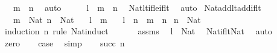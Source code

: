 \begin{isabellebody}
\ {\isachardoublequoteopen}{\isachardot}{\kern0pt}{\isachardot}{\kern0pt}{\isachardot}{\kern0pt}\ {\isasymle}\ m\ {\isacharplus}{\kern0pt}\ n{\isachardoublequoteclose}\ \isamarkupfalse%
\ auto\isanewline
\ \ \isamarkupfalse%
\ \isamarkupfalse%
\ {\isachardoublequoteopen}l\ {\isacharless}{\kern0pt}\ m\ {\isacharplus}{\kern0pt}\ n{\isachardoublequoteclose}\ \isamarkupfalse%
\ Nat{\isacharunderscore}{\kern0pt}lt{\isacharunderscore}{\kern0pt}if{\isacharunderscore}{\kern0pt}le{\isacharunderscore}{\kern0pt}if{\isacharunderscore}{\kern0pt}lt\ \isamarkupfalse%
\ auto\isanewline
\isanewline
{}\isamarkupfalse%
%
\endisatagproof
{\isafoldproof}%
%
\isadelimproof
\isanewline
%
\endisadelimproof
\isanewline
{}\isamarkupfalse%
\ Nat{\isacharunderscore}{\kern0pt}add{\isacharunderscore}{\kern0pt}lt{\isacharunderscore}{\kern0pt}add{\isacharunderscore}{\kern0pt}if{\isacharunderscore}{\kern0pt}lt{\isacharcolon}{\kern0pt}\isanewline
\ \ \ {\isachardoublequoteopen}m\ {\isacharcolon}{\kern0pt}\ Nat{\isachardoublequoteclose}\ {\isachardoublequoteopen}n\ {\isacharcolon}{\kern0pt}\ Nat{\isachardoublequoteclose}\isanewline
\ \ \ {\isachardoublequoteopen}l\ {\isacharless}{\kern0pt}\ m{\isachardoublequoteclose}\isanewline
\ \ \ {\isachardoublequoteopen}l\ {\isacharplus}{\kern0pt}\ n\ {\isacharless}{\kern0pt}\ m\ {\isacharplus}{\kern0pt}\ n{\isachardoublequoteclose}\isanewline
%
\isadelimproof
%
\endisadelimproof
%
\isatagproof
{}\isamarkupfalse%
\ {\isacartoucheopen}n\ {\isacharcolon}{\kern0pt}\ Nat{\isacartoucheclose}\isanewline
{}\isamarkupfalse%
\ {\isacharparenleft}{\kern0pt}induction\ n\ rule{\isacharcolon}{\kern0pt}\ Nat{\isacharunderscore}{\kern0pt}induct{\isacharparenright}{\kern0pt}\isanewline
\ \ \isanewline
\ \ \isamarkupfalse%
\ assms\ \isamarkupfalse%
\ {\isachardoublequoteopen}l\ {\isacharcolon}{\kern0pt}\ Nat{\isachardoublequoteclose}\ \isamarkupfalse%
\ Nat{\isacharunderscore}{\kern0pt}if{\isacharunderscore}{\kern0pt}lt{\isacharunderscore}{\kern0pt}Nat\ \isamarkupfalse%
\ auto\isanewline
\ \ \isamarkupfalse%
\ zero\ \isamarkupfalse%
\ \isamarkupfalse%
\ {\isachardoublequoteopen}{\isacharquery}{\kern0pt}case{\isachardoublequoteclose}\ \isamarkupfalse%
\ simp\isanewline
\ \ \isamarkupfalse%
\ {\isacharparenleft}{\kern0pt}succ\ n{\isacharparenright}{\kern0pt}\isanewline

\end{isabellebody}
